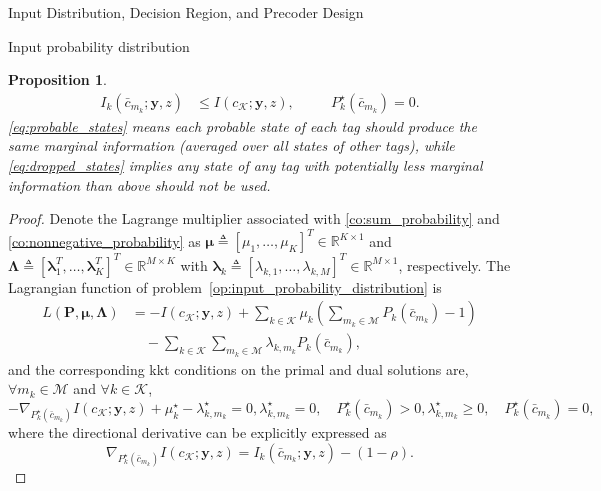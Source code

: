 \documentclass[journal]{IEEEtran}
\newtheorem{proposition}{Proposition}
\begin{document}
\begin{section}{Input Distribution, Decision Region, and Precoder Design}
\begin{subsection}{Input probability distribution}
\begin{proposition}
\begin{subequations}
\begin{alignat}{2}
						I_k(\bar{c}_{m_k};\boldsymbol{y},z) & \le I(c_{\mathcal{K}};\boldsymbol{y},z), \quad && P_k^{\star}(\bar{c}_{m_k}) = 0.\label{eq:dropped_states}
					\end{alignat}
				\end{subequations}
				\eqref{eq:probable_states} means each probable state of each tag should produce the same marginal information (averaged over all states of other tags), while \eqref{eq:dropped_states} implies any state of any tag with potentially less marginal information than above should not be used.
				\label{pr:optimal_conditions}
			\end{proposition}
			\begin{proof}
				Denote the Lagrange multiplier associated with \eqref{co:sum_probability} and \eqref{co:nonnegative_probability} as $\boldsymbol{\mu} \triangleq [\mu_1,\ldots,\mu_K]^T \in \mathbb{R}^{K \times 1}$ and $\boldsymbol{\Lambda} \triangleq [\boldsymbol{\lambda}_1^T,\ldots,\boldsymbol{\lambda}_K^T]^T \in \mathbb{R}^{M \times K}$ with $\boldsymbol{\lambda}_k \triangleq [\lambda_{k,1},\ldots,\lambda_{k,M}]^T \in \mathbb{R}^{M \times 1}$, respectively. The Lagrangian function of problem~\eqref{op:input_probability_distribution} is
				\begin{align}
					L(\boldsymbol{P},\boldsymbol{\mu},\boldsymbol{\Lambda})
					& = - I(c_{\mathcal{K}};\boldsymbol{y},z) + \sum_{k \in \mathcal{K}} \mu_k \left( \sum_{m_k \in \mathcal{M}} P_k(\bar{c}_{m_k}) - 1 \right)\nonumber\\
					& \quad - \sum_{k \in \mathcal{K}} \sum_{m_k \in \mathcal{M}} \lambda_{k,m_k} P_k(\bar{c}_{m_k}),
				\end{align}
				and the corresponding \gls{kkt} conditions on the primal and dual solutions are, $\forall m_k \in \mathcal{M}$ and $\forall k \in \mathcal{K}$,
				\begin{subequations}
					\begin{equation}
						- \nabla_{P_k^{\star}(\bar{c}_{m_k})} I(c_{\mathcal{K}};\boldsymbol{y},z) + \mu_k^{\star} - \lambda_{k,m_k}^{\star} = 0,
					\end{equation}
					\begin{equation}
						\lambda_{k,m_k}^{\star} = 0, \quad P_k^{\star}(\bar{c}_{m_k}) > 0,
					\end{equation}
					\begin{equation}
						\lambda_{k,m_k}^{\star} \ge 0, \quad P_k^{\star}(\bar{c}_{m_k}) = 0,
					\end{equation}
				\end{subequations}
				where the directional derivative can be explicitly expressed as
				\begin{equation}
					\nabla_{P_k^{\star}(\bar{c}_{m_k})} I(c_{\mathcal{K}};\boldsymbol{y},z) = I_k(\bar{c}_{m_k};\boldsymbol{y},z) - (1 - \rho).
				\end{equation}


\end{proof}
\end{subsection}
\end{section}
\end{document}
